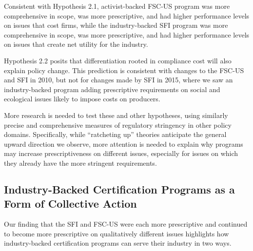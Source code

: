 \documentclass[
      12pt,
            Review ]{article}
\begin{document}
Consistent with Hypothesis 2.1, activist-backed FSC-US program was more comprehensive in scope, was more prescriptive, and had higher performance levels on issues that cost firms, while the industry-backed SFI program was more comprehensive in scope, was more prescriptive, and had higher performance levels on issues that create net utility for the industry.

Hypothesis 2.2 posits that differentiation rooted in compliance cost will also explain policy change. This prediction is consistent with changes to the FSC-US and SFI in 2010, but not for changes made by SFI in 2015, where we saw an industry-backed program adding prescriptive requirements on social and ecological issues likely to impose costs on producers.

More research is needed to test these and other hypotheses, using similarly precise and comprehensive measures of regulatory stringency in other policy domains. Specifically, while ``ratcheting up'' theories anticipate the general upward direction we observe, more attention is needed to explain why programs may increase prescriptiveness on different issues, especially for issues on which they already have the more stringent requirements.

\hypertarget{industry-backed-certification-programs-as-a-form-of-collective-action}{%
\subsection{Industry-Backed Certification Programs as a Form of Collective Action}\label{industry-backed-certification-programs-as-a-form-of-collective-action}}

Our finding that the SFI and FSC-US were each more prescriptive and continued to become more prescriptive on qualitatively different issues highlights how industry-backed certification programs can serve their industry in two ways.
\end{document}
